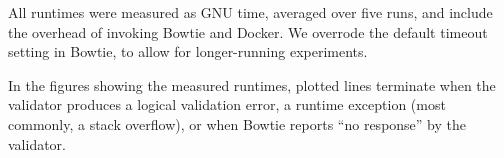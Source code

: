 All runtimes were measured as GNU time, averaged over five runs, and include the overhead of invoking Bowtie and Docker.
We overrode the default timeout setting in Bowtie, to allow for longer-running experiments.
%

In the figures showing the measured runtimes, plotted lines terminate when the validator produces a logical validation error, a runtime exception (most commonly, a stack overflow),
or when Bowtie reports \enquote{no response} by the validator.



